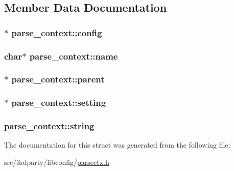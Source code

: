 \subsection{Member Data Documentation}
\hypertarget{structparse__context_aa200e722cbeaa2486da5c03113a630de}{
\subsubsection[{config}]{$\ast$ {\bf parse\_\-context::config}}}
\label{structparse__context_aa200e722cbeaa2486da5c03113a630de}
\hypertarget{structparse__context_a011e6f556f380ddb7ea6443310638d19}{
\subsubsection[{name}]{\setlength{\rightskip}{0pt plus 5cm}char$\ast$ {\bf parse\_\-context::name}}}
\label{structparse__context_a011e6f556f380ddb7ea6443310638d19}
\hypertarget{structparse__context_a79ae4fb7bb22de08f7f99c8478187e22}{
\subsubsection[{parent}]{$\ast$ {\bf parse\_\-context::parent}}}
\label{structparse__context_a79ae4fb7bb22de08f7f99c8478187e22}
\hypertarget{structparse__context_ab305aaa8de50d2803f062652b350d0e1}{
\subsubsection[{setting}]{$\ast$ {\bf parse\_\-context::setting}}}
\label{structparse__context_ab305aaa8de50d2803f062652b350d0e1}
\hypertarget{structparse__context_aa69b91bd3127bb918700074992130b4a}{
\subsubsection[{string}]{ {\bf parse\_\-context::string}}}
\label{structparse__context_aa69b91bd3127bb918700074992130b4a}


The documentation for this struct was generated from the following file:\begin{DoxyCompactItemize}
\item 
src/3rdparty/libconfig/\hyperlink{parsectx_8h}{parsectx.h}\end{DoxyCompactItemize}
